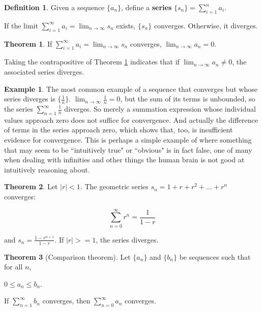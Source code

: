 \documentclass{article}
\theoremstyle{definition}
\newtheorem{definition}{Definition}[section]
\newtheorem{example}{Example}[section]
\newtheorem{theorem}{Theorem}[section]
\begin{document}
\begin{definition}
Given a sequence $\{a_n\}$, define a \textbf{series} $\{s_n\} = \sum\limits_{i=1}^n a_i$.

If the limit $\sum\limits_{i=1}^\infty a_i = \lim_{n \to \infty} s_n$ exists, $\{s_n\}$ converges. Otherwise, it diverges.
\end{definition}

\begin{theorem} \label{convergent-series-sequence}
If $\sum\limits_{i=1}^\infty a_i = \lim_{n \to \infty} s_n$ converges, $\lim_{n \to \infty} a_n = 0$.
\end{theorem}

Taking the contrapositive of Theorem \ref{convergent-series-sequence} indicates that if $\lim_{n \to \infty} a_n \neq 0$, the associated series diverges.

\begin{example} 
The most common example of a sequence that converges but whose series diverges is $\{\frac{1}{n}\}$. $\lim_{n \to \infty} \frac{1}{n} = 0$, but the sum of its terms is unbounded, so the series $\sum\limits_{n=1}^\infty \frac{1}{n}$ diverges. So merely a summation expression whose individual values approach zero does not suffice for convergence. And actually the difference of terms in the series approach zero, which shows that, too, is insufficient evidence for convergence. This is perhaps a simple example of where something that may seem to be ``intuitively true" or ``obvious" is in fact false, one of many when dealing with infinities and other things the human brain is not good at intuitively reasoning about.
\end{example}

\begin{theorem} \label{geometric-series}
Let $|r| < 1$. The geometric series $s_n = 1 + r + r^2 + \ldots + r^n$ converges:

\begin{equation}
\sum\limits_{n=0}^\infty r^n = \frac{1}{1-r}
\end{equation}

and $s_n = \frac{1 - r^{n+1}}{1 - r}$. If $|r| >= 1$, the series diverges.
\end{theorem}

\begin{theorem}[Comparison theorem]
Let $\{a_n\}$ and $\{b_n\}$ be sequences such that for all $n$,

\begin{center}
$0 \leq a_n \leq b_n$.
\end{center}

If $\sum\limits_{n=1}^\infty b_n$ converges, then $\sum\limits_{n=0}^\infty a_n$ converges.
\end{theorem}
\end{document}
